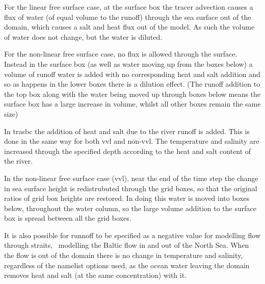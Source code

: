 \documentclass[../main/NEMO_manual]{subfiles}
\begin{document}
For the linear free surface case, at the surface box the tracer advection causes a flux of water
(of equal volume to the runoff) through the sea surface out of the domain,
which causes a salt and heat flux out of the model.
As such the volume of water does not change, but the water is diluted.

For the non-linear free surface case, no flux is allowed through the surface.
Instead in the surface box (as well as water moving up from the boxes below) a volume of runoff water is added with
no corresponding heat and salt addition and so as happens in the lower boxes there is a dilution effect.
(The runoff addition to the top box along with the water being moved up through
boxes below means the surface box has a large increase in volume, whilst all other boxes remain the same size)

In trasbc the addition of heat and salt due to the river runoff is added.
This is done in the same way for both vvl and non-vvl.
The temperature and salinity are increased through the specified depth according to
the heat and salt content of the river.

In the non-linear free surface case (vvl),
near the end of the time step the change in sea surface height is redistrubuted through the grid boxes,
so that the original ratios of grid box heights are restored.
In doing this water is moved into boxes below, throughout the water column,
so the large volume addition to the surface box is spread between all the grid boxes.

It is also possible for runnoff to be specified as a negative value for modelling flow through straits,
\ie\ modelling the Baltic flow in and out of the North Sea.
When the flow is out of the domain there is no change in temperature and salinity,
regardless of the namelist options used,
as the ocean water leaving the domain removes heat and salt (at the same concentration) with it.




\end{document}
